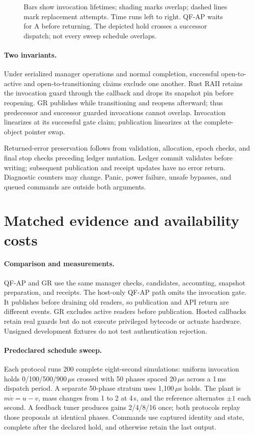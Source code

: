 \documentclass{article}
\begin{document}
\begin{figure}[!ht]
\centering

\caption{Bars show invocation lifetimes; shading marks overlap; dashed lines mark replacement attempts. Time runs left to right. QF-AP waits for A before returning. The depicted hold crosses a successor dispatch; not every sweep schedule overlaps.}
\label{fig:protocol}
\end{figure}

\paragraph{Two invariants.}
Under serialized manager operations and normal completion, successful open-to-active and open-to-transitioning claims exclude one another. Rust RAII retains the invocation guard through the callback and drops its snapshot pin before reopening. GR publishes while transitioning and reopens afterward; thus predecessor and successor guarded invocations cannot overlap. Invocation linearizes at its successful gate claim; publication linearizes at the complete-object pointer swap.

Returned-error preservation follows from validation, allocation, epoch checks, and final stop checks preceding ledger mutation. Ledger commit validates before writing; subsequent publication and receipt updates have no error return. Diagnostic counters may change. Panic, power failure, unsafe bypasses, and queued commands are outside both arguments.

\section{Matched evidence and availability costs}
\paragraph{Comparison and measurements.}
QF-AP and GR use the same manager checks, candidates, accounting, snapshot preparation, and receipts. The host-only QF-AP path omits the invocation gate. It publishes before draining old readers, so publication and API return are different events. GR excludes active readers before publication. Hosted callbacks retain real guards but do not execute privileged bytecode or actuate hardware. Unsigned development fixtures do not test authentication rejection.

\paragraph{Predeclared schedule sweep.}
Each protocol runs 200 complete eight-second simulations: uniform invocation holds 0/100/500/900\,$\mu$s crossed with 50 phases spaced 20\,$\mu$s across a 1\,ms dispatch period. A separate 50-phase stratum uses 1,100\,$\mu$s holds. The plant is $m\dot v=u-v$, mass changes from 1 to 2 at 4\,s, and the reference alternates $\pm1$ each second. A feedback tuner produces gains 2/4/8/16 once; both protocols replay those proposals at identical phases. Commands use captured identity and state, complete after the declared hold, and otherwise retain the last output.
\end{document}
